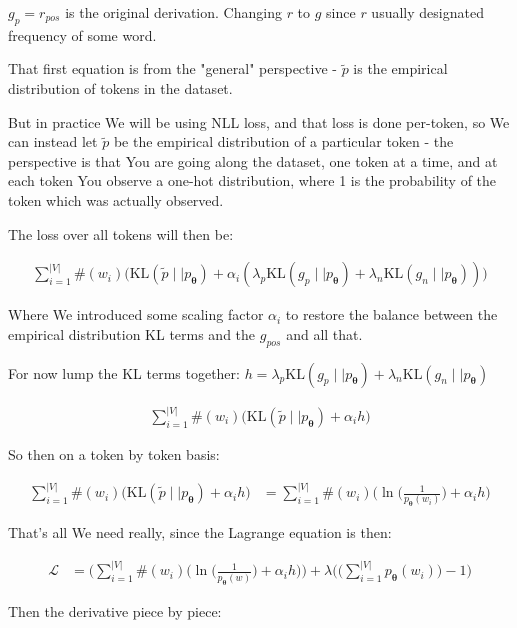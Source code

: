\documentclass{article}
\newcommand{\KL}{\mathrm{KL}}
\newcommand{\vtheta}{\boldsymbol{\theta}}
\newcommand{\model}{p_{\vtheta}}
\begin{document}
		$g_p = r_{pos}$ is the original derivation. Changing $r$ to $g$ since $r$ usually designated frequency of some word.
		
		That first equation is from the "general" perspective - $\tilde{p}$ is the empirical distribution of tokens in the dataset.
		
		But in practice We will be using NLL loss, and that loss is done per-token, so We can instead let $\tilde{p}$ be the empirical distribution of a particular token - the perspective is that You are going along the dataset, one token at a time, and at each token You observe a one-hot distribution, where 1 is the probability of the token which was actually observed.
		
	    The loss over all tokens will then be:
		
		\begin{align}
			\sum^{|V|}_{i=1} \#(w_i)\big(\KL(\tilde{p}\mid\mid\model) + \alpha_i(\lambda_p\KL(g_p\mid\mid\model) + \lambda_n\KL(g_n\mid\mid\model))\big)
		\end{align}
		
		Where We introduced some scaling factor $\alpha_i$ to restore the balance between the empirical distribution KL terms and the $g_{pos}$ and all that.
		
		
		For now lump the KL terms together: $h = \lambda_p\KL(g_p\mid\mid\model) + \lambda_n\KL(g_n\mid\mid\model)$
		
		\begin{align}
			\sum^{|V|}_{i=1} \#(w_i)\big(\KL(\tilde{p}\mid\mid\model) + \alpha_i h\big)
		\end{align}
		
		So then on a token by token basis:
		
		\begin{align}
			\sum^{|V|}_{i=1} \#(w_i) \big(\KL(\tilde{p}\mid\mid\model) + \alpha_i h \big)&= \sum^{|V|}_{i=1} \#(w_i) \bigg(\ln\bigg(\frac{1}{\model(w_i)}\bigg) + \alpha_i h \bigg)
		\end{align}
		
		That's all We need really, since the Lagrange equation is then:
		
		\begin{align}
			\mathcal{L} &= \bigg(\sum^{|V|}_{i=1} \#(w_i) \bigg(\ln\bigg(\frac{1}{\model(w)}\bigg) + \alpha_i h \bigg)\bigg) + \lambda\bigg(\bigg(\sum^{|V|}_{i=1} \model(w_i)\bigg) -1 \bigg) 
		\end{align}
		
		Then the derivative piece by piece:
		
\end{document}
